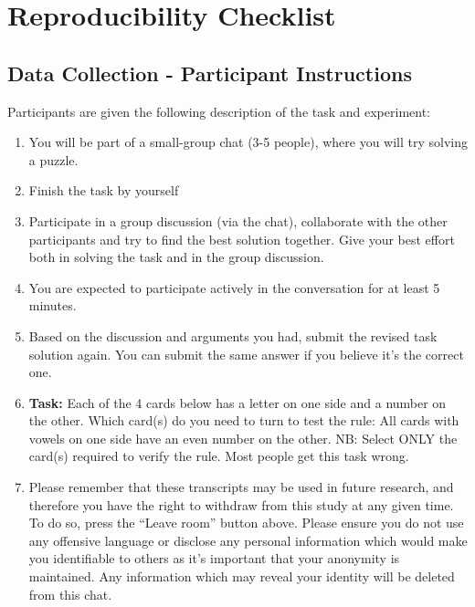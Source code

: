 \documentclass[acmsmall,manuscript,screen]{acmart}
\begin{document}



\appendix

\clearpage

\section{Reproducibility Checklist}
\subsection{Data Collection - Participant Instructions}
\label{app:reproducibility_insructions}
Participants are given the following description of the task and experiment:

\begin{enumerate}
\item You will be part of a small-group chat (3-5 people), where you will try solving a puzzle.
\item Finish the task by yourself
\item Participate in a group discussion (via the chat), collaborate with the other participants and try to find the best solution together. Give your best effort both in solving the task and in the group discussion.
\item You are expected to participate actively in the conversation for at least 5 minutes.

\item Based on the discussion and arguments you had, submit the revised task solution again. You can submit the same answer if you believe it's the correct one.

\item \textbf{Task:} Each of the 4 cards below has a letter on one side and a number on the other. Which card(s) do you need to turn to test the rule:
All cards with vowels on one side have an even number on the other.
NB: Select ONLY the card(s) required to verify the rule. Most people get this task wrong.

\item Please remember that these transcripts may be used in future research, and therefore you have the right to withdraw from this study at any given time. To do so, press the ``Leave room'' button above. Please ensure you do not use any offensive language or disclose any personal information which would make you identifiable to others as it’s important that your anonymity is maintained. Any information which may reveal your identity will be deleted from this chat.
\end{enumerate}
\end{document}

